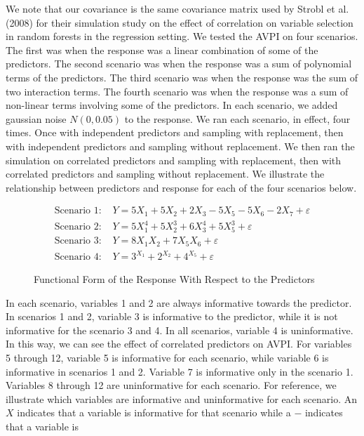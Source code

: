 \documentclass[12pt,twoside]{reedthesis}
\theoremstyle{definition}
\theoremstyle{definition}
\theoremstyle{definition}
\theoremstyle{remark}
\begin{document}
We note that our covariance is the same covariance matrix used by Strobl
et al. (2008) for their simulation study on the effect of correlation on
variable selection in random forests in the regression setting. We
tested the AVPI on four scenarios. The first was when the response was a
linear combination of some of the predictors. The second scenario was
when the response was a sum of polynomial terms of the predictors. The
third scenario was when the response was the sum of two interaction
terms. The fourth scenario was when the response was a sum of non-linear
terms involving some of the predictors. In each scenario, we added
gaussian noise \(N(0, 0.05)\) to the response. We ran each scenario, in
effect, four times. Once with independent predictors and sampling with
replacement, then with independent predictors and sampling without
replacement. We then ran the simulation on correlated predictors and
sampling with replacement, then with correlated predictors and sampling
without replacement. We illustrate the relationship between predictors
and response for each of the four scenarios below. \par
\begin{figure}[h]
\begin{align}
\text{Scenario 1: } & Y=5X_1+5X_2+2X_3-5X_5-5X_6-2X_7+\varepsilon \nonumber \\
\text{Scenario 2: } & Y=5X_1^4+5X_2^3+6X_3^4+5X_5^3+\varepsilon \nonumber \\
\text{Scenario 3: } & Y=8X_1X_2+7X_5X_6+\varepsilon \nonumber \\
\text{Scenario 4: } & Y=3^{X_1}+2^{X_2}+4^{X_5}+\varepsilon \nonumber
\end{align}
\caption{Functional Form of the Response With Respect to the Predictors}
\label{ScenarioForms}
\end{figure}
In each scenario, variables 1 and 2 are always informative towards the
predictor. In scenarios 1 and 2, variable 3 is informative to the
predictor, while it is not informative for the scenario 3 and 4. In all
scenarios, variable 4 is uninformative. In this way, we can see the
effect of correlated predictors on AVPI. For variables 5 through 12,
variable 5 is informative for each scenario, while variable 6 is
informative in scenarios 1 and 2. Variable 7 is informative only in the
scenario 1. Variables 8 through 12 are uninformative for each scenario.
For reference, we illustrate which variables are informative and
uninformative for each scenario. An \(X\) indicates that a variable is
informative for that scenario while a \(-\) indicates that a variable is
\end{document}
